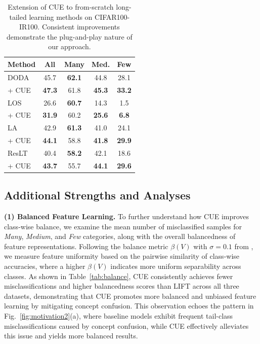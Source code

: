 \begin{table}[!t]
\centering
\caption{Extension of CUE to from-scratch long-tailed learning methods on CIFAR100-IR100. Consistent improvements demonstrate the plug-and-play nature of our approach.}
\vspace{-0.5em}
\label{tab:extension_scratch}
\small
\begin{tabular}{l|cccc}
\toprule
Method & \textbf{All} & \textbf{Many} & \textbf{Med.} & \textbf{Few} \\
\midrule
DODA~\cite{wang2024kill} &  45.7  &  \textbf{62.1}  &  44.8  &  28.1  \\
+ CUE &  \textbf{47.3}  &  61.8  &  \textbf{45.3}  &  \textbf{33.2}  \\
\midrule
LOS~\cite{sun2025rethinking} &  26.6  &  \textbf{60.7}  &  14.3  &  1.5  \\
+ CUE &  \textbf{31.9}  &  60.2  &  \textbf{25.6}  &  \textbf{6.8}  \\
\midrule
LA~\cite{menon2021longtail} & 42.9 & \textbf{61.3} & 41.0 & 24.1 \\
+ CUE & \textbf{44.1} & 58.8 & \textbf{41.8} & \textbf{29.9} \\
\midrule
ResLT~\cite{cui2022reslt} & 40.4 & \textbf{58.2} & 42.1 & 18.6 \\
+ CUE & \textbf{43.7} & 55.7 & \textbf{44.1} & \textbf{29.6} \\
\bottomrule
\end{tabular}
\vspace{-1.5em}
\end{table}


\subsection{Additional Strengths and Analyses}
\noindent \textbf{(1) Balanced Feature Learning.}
To further understand how CUE improves class-wise balance, we examine the mean number of misclassified samples for \textit{Many}, \textit{Medium}, and \textit{Few} categories, along with the overall balancedness of feature representations. 
Following the balance metric $\beta(V)$ with $\sigma=0.1$ from \cite{kang2020exploring}, we measure feature uniformity based on the pairwise similarity of class-wise accuracies, where a higher $\beta(V)$ indicates more uniform separability across classes. 
As shown in Table~\ref{tab:balance}, CUE consistently achieves fewer misclassifications and higher balancedness scores than LIFT across all three datasets, demonstrating that CUE promotes more balanced and unbiased feature learning by mitigating concept confusion. 
This observation echoes the pattern in Fig.~\ref{fig:motivation2}(a), where baseline models exhibit frequent tail-class misclassifications caused by concept confusion, while CUE effectively alleviates this issue and yields more balanced results.


